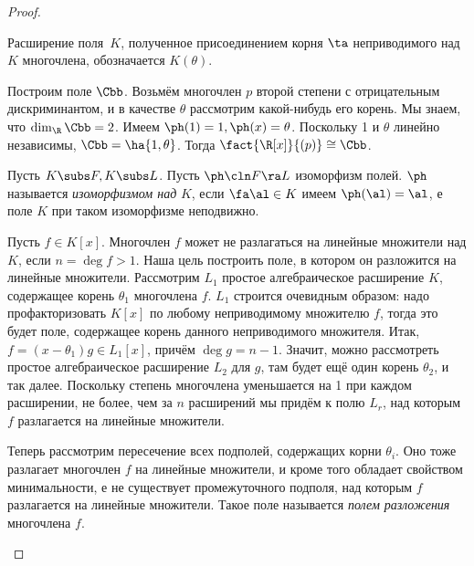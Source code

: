 \documentclass[a4paper]{article}
\begin{document}
\begin{proof}
\begin{note}
Расширение поля~$K$, полученное присоединением корня $\ta$ неприводимого над $K$ многочлена, обозначается
$K(\theta)$.
\end{note}

\begin{ex}
Построим поле $\Cbb$. Возьмём многочлен $p$ второй степени с отрицательным  дискриминантом, и в качестве
$\theta$ рассмотрим какой-нибудь его корень. Мы знаем, что $\dim_\R \Cbb=2$. Имеем $\ph(1)=1, \ph(x)=\theta$.
Поскольку 1 и $\theta$ линейно независимы, $\Cbb = \ha{1,\theta}$. Тогда $\fact{\R[x]}{(p)} \cong \Cbb$.
\end{ex}

Пусть $K \subs F, K \subs L$. Пусть $\ph\cln F \ra L$ изоморфизм полей.  $\ph$ называется \emph{изоморфизмом
над} $K$, если $\fa \al \in K$ имеем $\ph(\al)=\al$, е поле $K$ при таком изоморфизме неподвижно.

Пусть $f \in K[x]$. Многочлен $f$ может не разлагаться на линейные множители  над $K$, если $n=\deg f > 1$.
Наша цель построить поле, в котором он разложится на линейные множители. Рассмотрим $L_1$ простое
алгебраическое расширение $K$, содержащее корень $\theta_1$ многочлена $f$. $L_1$ строится очевидным образом:
надо профакторизовать $K[x]$ по любому неприводимому множителю $f$, тогда это будет поле, содержащее корень
данного неприводимого множителя. Итак, $f=(x-\theta_1)g \in L_1[x]$, причём $\deg g = n - 1$. Значит, можно
рассмотреть простое алгебраическое расширение $L_2$ для $g$, там будет ещё один корень $\theta_2$, и так
далее. Поскольку степень многочлена уменьшается на 1 при каждом расширении, не более, чем за $n$ расширений
мы придём к полю $L_r$, над которым $f$ разлагается на линейные множители.

\begin{df}
Теперь рассмотрим пересечение всех подполей, содержащих корни $\theta_i$.  Оно тоже разлагает многочлен $f$
на линейные множители, и кроме того обладает свойством минимальности, е не существует промежуточного
подполя, над которым $f$ разлагается на линейные множители. Такое поле называется \emph{полем разложения} многочлена $f$.
\end{df}


\end{proof}
\end{document}
